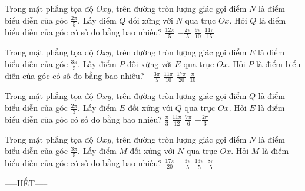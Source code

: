 \documentclass[12pt,a4paper]{article}
\begin{document}
\begin{ex}
   Trong mặt phẳng tọa độ ${Oxy}$, trên đường tròn lượng giác gọi điểm ${N}$ là điểm biểu diễn của góc $\frac{2 \pi}{5}$. Lấy điểm ${Q}$ đối xứng với ${N}$ qua trục ${Ox}$. Hỏi ${Q}$ là điểm biểu diễn của góc có số đo bằng bao nhiêu? 
\choice
{ $\frac{12 \pi}{5}$ }
   { \True $- \frac{2 \pi}{5}$ }
     { $\frac{9 \pi}{10}$ }
    { $\frac{11 \pi}{15}$ }
\end{ex}

\begin{ex}
   Trong mặt phẳng tọa độ ${Oxy}$, trên đường tròn lượng giác gọi điểm ${E}$ là điểm biểu diễn của góc $\frac{3 \pi}{5}$. Lấy điểm ${P}$ đối xứng với ${E}$ qua trục ${Ox}$. Hỏi ${P}$ là điểm biểu diễn của góc có số đo bằng bao nhiêu? 
\choice
{ \True $- \frac{3 \pi}{5}$ }
   { $\frac{11 \pi}{10}$ }
     { $\frac{17 \pi}{20}$ }
    { $\frac{\pi}{10}$ }
\end{ex}

\begin{ex}
   Trong mặt phẳng tọa độ ${Oxy}$, trên đường tròn lượng giác gọi điểm ${Q}$ là điểm biểu diễn của góc $\frac{2 \pi}{3}$. Lấy điểm ${E}$ đối xứng với ${Q}$ qua trục ${Ox}$. Hỏi ${E}$ là điểm biểu diễn của góc có số đo bằng bao nhiêu? 
\choice
{ $\frac{\pi}{3}$ }
   { $\frac{11 \pi}{12}$ }
     { $\frac{7 \pi}{6}$ }
    { \True $- \frac{2 \pi}{3}$ }
\end{ex}

\begin{ex}
   Trong mặt phẳng tọa độ ${Oxy}$, trên đường tròn lượng giác gọi điểm ${N}$ là điểm biểu diễn của góc $\frac{3 \pi}{5}$. Lấy điểm ${M}$ đối xứng với ${N}$ qua trục ${Ox}$. Hỏi ${M}$ là điểm biểu diễn của góc có số đo bằng bao nhiêu? 
\choice
{ $\frac{17 \pi}{20}$ }
   { \True $- \frac{3 \pi}{5}$ }
     { $\frac{13 \pi}{5}$ }
    { $\frac{8 \pi}{5}$ }
\end{ex}


 \begin{center}
-----HẾT-----
\end{center}

\end{document}
